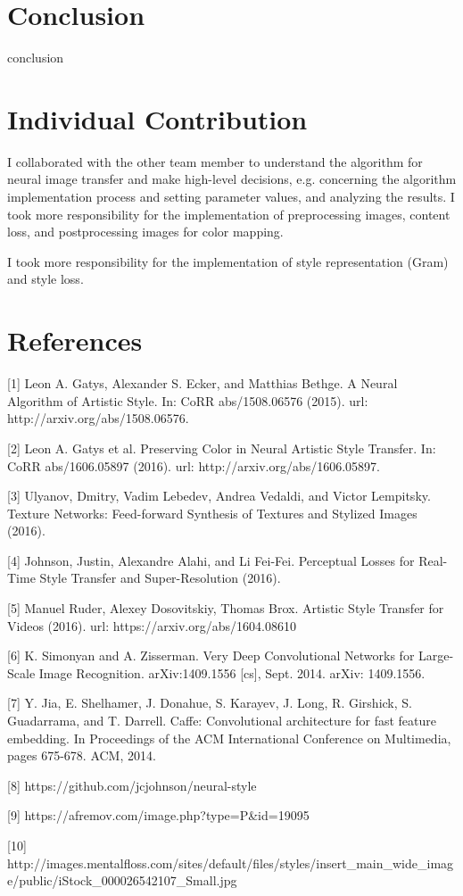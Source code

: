 \documentclass[10pt,twocolumn,letterpaper]{article}
\begin{document}
\section{Conclusion}

conclusion

\section{Individual Contribution}

I collaborated with the other team member to understand the algorithm for neural image transfer and make high-level decisions, e.g. concerning the algorithm implementation process and setting parameter values, and analyzing the results. I took more responsibility for the implementation of preprocessing images, content loss, and postprocessing images for color mapping.

I took more responsibility for the implementation of style representation (Gram) and style loss.

\section{References}

[1] Leon A. Gatys, Alexander S. Ecker, and Matthias Bethge. A Neural Algorithm of Artistic Style. In: CoRR abs/1508.06576 (2015). url: http://arxiv.org/abs/1508.06576.

[2] Leon A. Gatys et al. Preserving Color in Neural Artistic Style Transfer. In: CoRR abs/1606.05897 (2016). url: http://arxiv.org/abs/1606.05897.

[3] Ulyanov, Dmitry, Vadim Lebedev, Andrea Vedaldi, and Victor Lempitsky. Texture Networks: Feed-forward Synthesis of Textures and Stylized Images (2016).

[4] Johnson, Justin, Alexandre Alahi, and Li Fei-Fei. Perceptual Losses for Real-Time Style Transfer and Super-Resolution (2016).

[5] Manuel Ruder, Alexey Dosovitskiy, Thomas Brox. Artistic Style Transfer for Videos (2016). url: https://arxiv.org/abs/1604.08610

[6] K. Simonyan and A. Zisserman. Very Deep Convolutional Networks for Large-Scale Image Recognition. arXiv:1409.1556 [cs], Sept. 2014. arXiv: 1409.1556.

[7] Y. Jia, E. Shelhamer, J. Donahue, S. Karayev, J. Long, R. Girshick, S. Guadarrama, and T. Darrell. Caffe: Convolutional
architecture for fast feature embedding. In Proceedings of the ACM International Conference on Multimedia, pages 675-678. ACM, 2014.

[8] https://github.com/jcjohnson/neural-style

[9] https://afremov.com/image.php?type=P&id=19095

[10] http://images.mentalfloss.com/sites/default/files/styles/insert_main_wide_image/public/iStock_000026542107_Small.jpg

{\small


}
\end{document}
